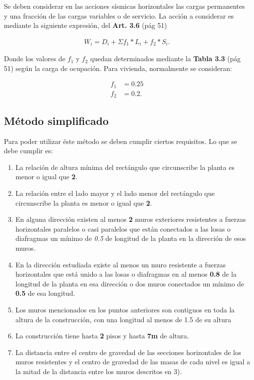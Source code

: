 \documentclass[../main.tex]{subfiles}
\begin{document}
Se deben considerar en las acciones sísmicas horizontales las cargas permanentes
y una fracción de las cargas variables o de servicio. La acción a considerar
es mediante la siguiente expresión, del \textbf{Art. 3.6} (pág 51)

\begin{align*}
  W_i = D_i + \Sigma f_1 *L_i + f_2 * S_i
.\end{align*}

Donde los valores de $f_1$ y $f_2$ quedan determinados mediante la \textbf{Tabla 3.3}
(pág 51) según la carga de ocupación. Para vivienda, normalmente se consideran:

\begin{align*}
  f_1 &= 0.25 \\[5pt]
  f_2 &= 0.2
.\end{align*}




\subsection{Método simplificado}

Para poder utilizar éste método se deben cumplir ciertos requisitos. Lo que 
se debe cumplir es:

\begin{enumerate}
  \item La relación de altura mínima del rectángulo que circunscribe la planta
    es menor o igual que \textbf{2}.
  \item La relación entre el lado mayor y el lado menor del rectángulo que
    circunscribe la planta es menor o igual que \textbf{2}.
  \item En alguna dirección existen al menos \textbf{2} muros exteriores
    resistentes a fuerzas horizontales paralelos o casi paralelos que están
    conectados a las losas o diafragmas un mínimo de \textit{0.5} de longitud
    de la planta en la dirección de esos muros.
  \item En la dirección estudiada existe al menos un muro resistente a fuerzas
    horizontales que está unido a las losas o diafragmas en al menos \textbf{0.8}
    de la longitud de la planta en esa dirección o dos muros conectados un 
    mínimo de \textbf{0.5} de esa longitud.
  \item Los muros mencionados en los puntos anteriores son contiguos en toda
    la altura de la construcción, con una longitud al menos de 1.5 de su altura
  \item La construcción tiene hasta \textbf{2} pisos y hasta \textbf{7m} de altura.
  \item La distancia entre el centro de gravedad de las secciones horizontales
    de los muros resistentes y el centro de gravedad de las masas de cada
    nivel es igual a la mitad de la distancia entre los muros descritos en 3).
\end{enumerate}
\end{document}

